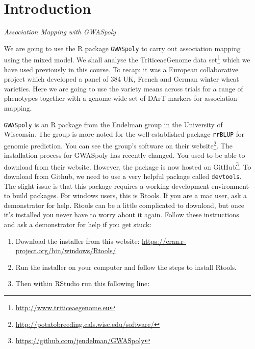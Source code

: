 \documentclass[
]{book}
\newenvironment{Shaded}{\begin{snugshade}}{\end{snugshade}}
\newcommand{\AttributeTok}[1]{\textcolor[rgb]{0.77,0.63,0.00}{#1}}
\newcommand{\FunctionTok}[1]{\textcolor[rgb]{0.00,0.00,0.00}{#1}}
\newcommand{\NormalTok}[1]{#1}
\newcommand{\SpecialCharTok}[1]{\textcolor[rgb]{0.00,0.00,0.00}{#1}}
\newcommand{\StringTok}[1]{\textcolor[rgb]{0.31,0.60,0.02}{#1}}
\renewcommand{\href}[2]{#2\footnote{\url{#1}}}
\begin{document}
\hypertarget{introduction-1}{%
\section{Introduction}\label{introduction-1}}

\emph{Association Mapping with GWASpoly}

We are going to use the R package \texttt{GWASpoly} to carry out association mapping using the mixed model. We shall analyse the \href{http://www.triticeaegenome.eu}{TriticeaeGenome data set} which we have used previously in this course. To recap: it was a European collaborative project which developed a panel of 384 UK, French and German winter wheat varieties. Here we are going to use the variety means across trials for a range of phenotypes together with a genome-wide set of DArT markers for association mapping.

\texttt{GWASpoly} is an R package from the Endelman group in the University of Wisconsin. The group is more noted for the well-established package \texttt{rrBLUP} for genomic prediction. You can see the group's software on their \href{http://potatobreeding.cals.wisc.edu/software/}{website}. The installation process for GWASpoly has recently changed. You used to be able to download from their website. However, the package is now hosted on \href{https://github.com/jendelman/GWASpoly}{GitHub}. To download from Github, we need to use a very helpful package called \texttt{devtools}. The slight issue is that this package requires a working development environment to build packages. For windows users, this is Rtools. If you are a mac user, ask a demonstrator for help. Rtools can be a little complicated to download, but once it's installed you never have to worry about it again. Follow these instructions and ask a demonstrator for help if you get stuck:

\begin{enumerate}
\def\labelenumi{\arabic{enumi}.}
\item
  Download the installer from this website: \url{https://cran.r-project.org/bin/windows/Rtools/}
\item
  Run the installer on your computer and follow the steps to install Rtools.
\item
  Then within RStudio run this following line:
\end{enumerate}

\begin{Shaded}
\end{Shaded}
\end{document}

